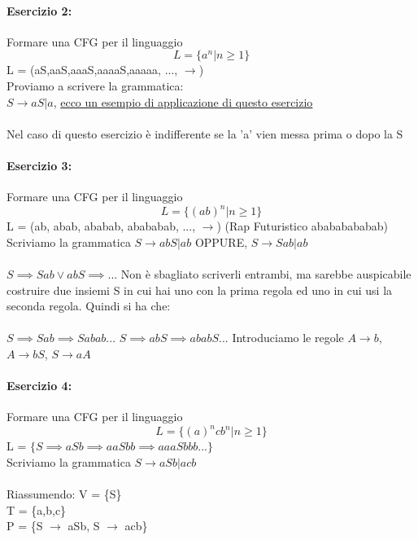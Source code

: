 \documentclass[12pt, a4paper, openany, oneside]{book}
\begin{document}
\paragraph{Esercizio 2: }Formare una CFG per il linguaggio \\
\[L = \{a^{n} | n \geq 1 \}\]
L = (aS,aaS,aaaS,aaaaS,aaaaa, ..., $\to$)
\\ Proviamo a scrivere la grammatica: \\
$S \to aS | a$, \href{https://www.youtube.com/watch?v=ATNolrWTYuU}
{ecco un esempio di applicazione di questo esercizio} 
\\ \\
Nel caso di questo esercizio è indifferente se la 'a' vien messa prima o dopo
la S
\paragraph{Esercizio 3: }Formare una CFG per il linguaggio \\
\[L = \{ (ab)^{n} | n \geq 1 \}\]
L = (ab, abab, ababab, abababab, ..., $\to$) (Rap Futuristico abababababab)
\\ Scriviamo la grammatica
$S \to abS | ab$ OPPURE, $S \to Sab | ab$
\\ \\
$S \implies Sab \vee abS \implies ... $ Non è sbagliato scriverli entrambi, ma
sarebbe auspicabile costruire due insiemi S in cui hai uno con la prima regola
ed uno in cui usi la seconda regola. Quindi si ha che: \\ \\
$S \implies Sab \implies Sabab ... $
$S \implies abS \implies  ababS ... $
Introduciamo le regole $A \to b$, $A \to bS$, $S \to aA$
\paragraph{Esercizio 4: }Formare una CFG per il linguaggio \\
\[L = \{ (a)^{n}cb^{n} | n \geq 1 \}\]
L = $\{S \implies aSb \implies aaSbb \implies aaaSbbb ...\}$
\\ Scriviamo la grammatica
$S \to aSb | acb$
\\ \\
Riassumendo: 
V = \{S\} \\
T = \{a,b,c\} \\
P = \{S $\to$ aSb, S $\to$ acb\}
\end{document}
